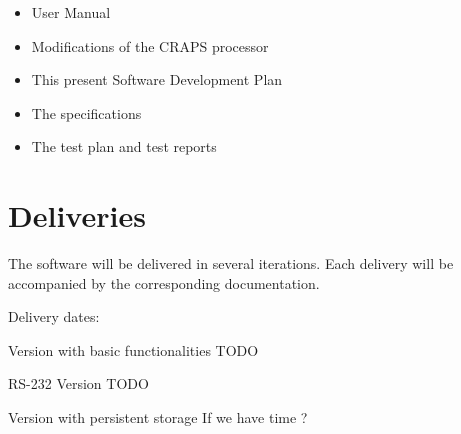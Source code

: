 \documentclass{article}
\begin{document}
    \begin{itemize}
      \item User Manual
      \item Modifications of the CRAPS processor
      \item This present Software Development Plan
      \item The specifications
      \item The test plan and test reports
    \end{itemize}

    \section{Deliveries}
      The software will be delivered in several iterations.
      Each delivery will be accompanied by the corresponding documentation.

      Delivery dates:
      \begin{description}
          \item{Version with basic functionalities} TODO
          \item{RS-232 Version} TODO
          \item{Version with persistent storage} If we have time ?
      \end{description}
\end{document}

